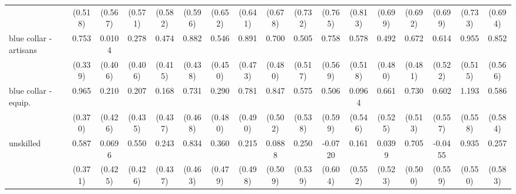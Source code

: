 {\begin{tabular}{l*{16}{c}}
                    &     (0.518)         &     (0.567)         &     (0.571)         &     (0.582)         &     (0.596)         &     (0.652)         &     (0.641)         &     (0.678)         &     (0.732)         &     (0.765)         &     (0.813)         &     (0.699)         &     (0.692)         &     (0.699)         &     (0.733)         &     (0.694)         \\
[1em]
blue collar - artisans&       0.753\sym{*}  &      0.0104         &       0.278         &       0.474         &       0.882\sym{*}  &       0.546         &       0.891         &       0.700         &       0.505         &       0.758         &       0.578         &       0.492         &       0.672         &       0.614         &       0.955         &       0.852         \\
                    &     (0.339)         &     (0.406)         &     (0.406)         &     (0.415)         &     (0.438)         &     (0.450)         &     (0.473)         &     (0.480)         &     (0.517)         &     (0.569)         &     (0.518)         &     (0.480)         &     (0.481)         &     (0.522)         &     (0.515)         &     (0.566)         \\
[1em]
blue collar - equip.&       0.965\sym{**} &       0.210         &       0.207         &       0.168         &       0.731         &       0.290         &       0.781         &       0.847         &       0.575         &       0.506         &      0.0964         &       0.661         &       0.730         &       0.602         &       1.193\sym{*}  &       0.586         \\
                    &     (0.370)         &     (0.426)         &     (0.435)         &     (0.437)         &     (0.468)         &     (0.480)         &     (0.490)         &     (0.502)         &     (0.538)         &     (0.599)         &     (0.546)         &     (0.525)         &     (0.513)         &     (0.557)         &     (0.558)         &     (0.584)         \\
[1em]
unskilled           &       0.587         &      0.0696         &       0.550         &       0.243         &       0.834         &       0.360         &       0.215         &      0.0888         &       0.250         &     -0.0720         &       0.161         &      0.0399         &       0.705         &     -0.0455         &       0.935         &       0.257         \\
                    &     (0.371)         &     (0.425)         &     (0.426)         &     (0.437)         &     (0.463)         &     (0.479)         &     (0.498)         &     (0.509)         &     (0.539)         &     (0.604)         &     (0.552)         &     (0.523)         &     (0.500)         &     (0.559)         &     (0.550)         &     (0.583)         \\

\end{tabular}}
